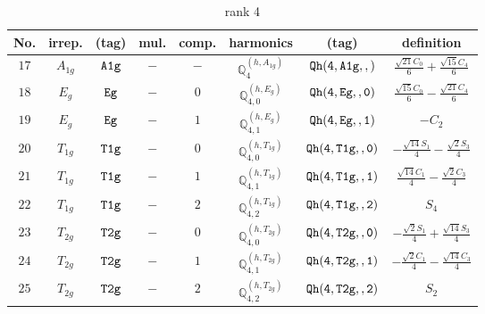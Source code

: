 \documentclass[fleqn,8pt]{jsarticle}
\begin{document}
\begin{table}[ht!]
\begin{center}
\caption{rank 4}
\renewcommand{\arraystretch}{1.3}
\begin{tabular}{cccccccc} \hline \hline
No. & irrep. & (tag) & mul. & comp. & harmonics & (tag) & definition \\ \hline
$ 17 $ & $ A_{1g} $ & $ {\tt A1g} $ & $ - $ & $ - $ & $ \mathbb{Q}_{4}^{(h,A_{1g})} $ & $ {\tt Qh(4,A1g,,)} $ & $ \frac{\sqrt{21} C_{0}}{6} + \frac{\sqrt{15} C_{4}}{6} $ \\
$ 18 $ & $ E_{g} $ & $ {\tt Eg} $ & $ - $ & $ 0 $ & $ \mathbb{Q}_{4,0}^{(h,E_{g})} $ & $ {\tt Qh(4,Eg,,0)} $ & $ \frac{\sqrt{15} C_{0}}{6} - \frac{\sqrt{21} C_{4}}{6} $ \\
$ 19 $ & $ E_{g} $ & $ {\tt Eg} $ & $ - $ & $ 1 $ & $ \mathbb{Q}_{4,1}^{(h,E_{g})} $ & $ {\tt Qh(4,Eg,,1)} $ & $ - C_{2} $ \\
$ 20 $ & $ T_{1g} $ & $ {\tt T1g} $ & $ - $ & $ 0 $ & $ \mathbb{Q}_{4,0}^{(h,T_{1g})} $ & $ {\tt Qh(4,T1g,,0)} $ & $ - \frac{\sqrt{14} S_{1}}{4} - \frac{\sqrt{2} S_{3}}{4} $ \\
$ 21 $ & $ T_{1g} $ & $ {\tt T1g} $ & $ - $ & $ 1 $ & $ \mathbb{Q}_{4,1}^{(h,T_{1g})} $ & $ {\tt Qh(4,T1g,,1)} $ & $ \frac{\sqrt{14} C_{1}}{4} - \frac{\sqrt{2} C_{3}}{4} $ \\
$ 22 $ & $ T_{1g} $ & $ {\tt T1g} $ & $ - $ & $ 2 $ & $ \mathbb{Q}_{4,2}^{(h,T_{1g})} $ & $ {\tt Qh(4,T1g,,2)} $ & $ S_{4} $ \\
$ 23 $ & $ T_{2g} $ & $ {\tt T2g} $ & $ - $ & $ 0 $ & $ \mathbb{Q}_{4,0}^{(h,T_{2g})} $ & $ {\tt Qh(4,T2g,,0)} $ & $ - \frac{\sqrt{2} S_{1}}{4} + \frac{\sqrt{14} S_{3}}{4} $ \\
$ 24 $ & $ T_{2g} $ & $ {\tt T2g} $ & $ - $ & $ 1 $ & $ \mathbb{Q}_{4,1}^{(h,T_{2g})} $ & $ {\tt Qh(4,T2g,,1)} $ & $ - \frac{\sqrt{2} C_{1}}{4} - \frac{\sqrt{14} C_{3}}{4} $ \\
$ 25 $ & $ T_{2g} $ & $ {\tt T2g} $ & $ - $ & $ 2 $ & $ \mathbb{Q}_{4,2}^{(h,T_{2g})} $ & $ {\tt Qh(4,T2g,,2)} $ & $ S_{2} $ \\
 \hline \hline
\end{tabular}
\end{center}
\end{table}
\end{document}
